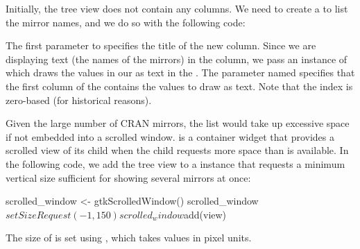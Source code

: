 \documentclass[article,shortnames]{jss}
\begin{document}

Initially, the tree view does not contain any columns. We need to
create a  to list the mirror names, and we do
so with the following code:
The first parameter to  specifies the title of
the new column. Since we are displaying text (the names of the
mirrors) in the column, we pass an instance of
 which draws the values in our
 as text in the . The parameter
named  specifies that the first column of the
 contains the values to draw as text. Note that the
index is zero-based (for historical reasons).

Given the large number of CRAN mirrors, the list would take up
excessive space
if not embedded into a scrolled window.  is a
container 
widget that provides a scrolled view of its child when the child
requests more
space than is available. In the following code, we add the tree view
to a  
instance that requests a minimum vertical size sufficient for showing
several mirrors at once:
\begin{Code}
scrolled_window <- gtkScrolledWindow()
scrolled_window$setSizeRequest(-1, 150)
scrolled_window$add(view)
\end{Code}
The size of  is set using
, which takes values in pixel units.
\end{document}
